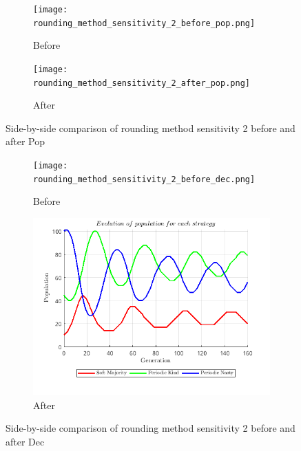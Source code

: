 \documentclass[12pt]{report}
\begin{document}
\begin{figure}[H]
    \centering
    \begin{subfigure}[t]{0.45\textwidth}
        \centering
        \texttt{[image: rounding\_method\_sensitivity\_2\_before\_pop.png]}
        \caption{Before}
    \end{subfigure}
    \hfill
    \begin{subfigure}[t]{0.45\textwidth}
        \centering
        \texttt{[image: rounding\_method\_sensitivity\_2\_after\_pop.png]}
        \caption{After}
    \end{subfigure}
    \caption{Side-by-side comparison of rounding method sensitivity 2 before and after Pop}
\end{figure}

\begin{figure}[H]
    \centering
    \begin{subfigure}[t]{0.45\textwidth}
        \centering
        \texttt{[image: rounding\_method\_sensitivity\_2\_before\_dec.png]}
        \caption{Before}
    \end{subfigure}
    \hfill
    \begin{subfigure}[t]{0.45\textwidth}
        \centering
        \includegraphics[width=\textwidth]{rounding_method_sensitivity_2_after_dec.png}
        \caption{After}
    \end{subfigure}
    \caption{Side-by-side comparison of rounding method sensitivity 2 before and after Dec}
\end{figure}
\end{document}
